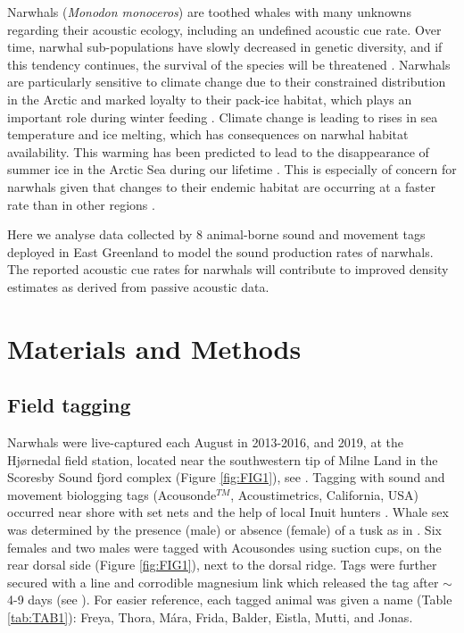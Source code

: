 \documentclass[preprint]{JASA}
\begin{document}
Narwhals (\textit{Monodon monoceros}) are toothed whales with many unknowns regarding their acoustic ecology, including an undefined acoustic cue rate. Over time, narwhal sub-populations have slowly decreased in genetic diversity, and if this  tendency continues, the survival of the species will be threatened \citep{Westbury_2019}. Narwhals are particularly sensitive to climate change due to their constrained distribution in the Arctic and marked loyalty to their pack-ice habitat, which plays an important role during winter feeding \citep{Laidre_2008,williams2011, shuert2022decadal}. Climate change is leading to rises in sea temperature and ice melting, which has consequences on narwhal habitat availability. This warming has been predicted to lead to the disappearance of summer ice in the Arctic Sea during our lifetime \citep{stocker2014}. This is especially of concern for narwhals given that changes to their endemic habitat are occurring at a faster rate than in other regions \citep{Louis_2020}.

Here we analyse data collected by 8 animal-borne sound and movement tags deployed in East Greenland to model the sound production rates of narwhals. The reported acoustic cue rates for narwhals will contribute to improved density estimates as derived from passive acoustic data.

\section{\label{sec:2} Materials and Methods}

\subsection{\label{sec:2:1} Field tagging}

Narwhals were live-captured each August in 2013-2016, and 2019, at the Hjørnedal field station, located near the southwestern tip of Milne Land in the Scoresby Sound fjord complex (Figure \ref{fig:FIG1}), see \citep{blackwell2018}. Tagging with sound and movement biologging tags (Acousonde$^{TM}$, Acoustimetrics, California, USA) occurred near shore with set nets and the help of local Inuit hunters \citep{blackwell2018}. Whale sex was determined by the presence (male) or absence (female) of a tusk 
as in \citet{heide2015predictable}. Six females and two males were tagged with Acousondes using suction cups, on the rear dorsal side (Figure \ref{fig:FIG1}), next to the dorsal ridge.  Tags were further secured with a line and corrodible magnesium link which released the tag after $\sim$4-9 days (see \citet{blackwell2018}).  For easier reference, each tagged animal was given a name (Table \ref{tab:TAB1}): Freya, Thora, Mára, Frida, Balder, Eistla, Mutti, and Jonas. 
\end{document}
